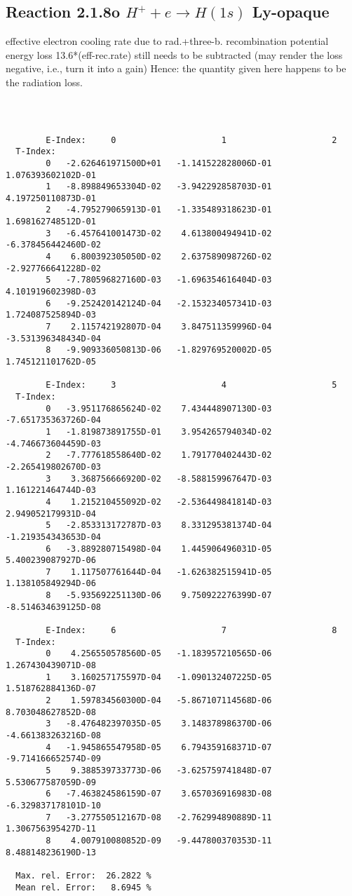 \documentclass[12pt,dvipdfmx]{article}
\begin{document}
\subsection{
  Reaction 2.1.8o $H^+ + e \rightarrow H(1s) $ Ly-opaque
}

   effective electron cooling rate due to rad.+three-b. recombination
   potential energy loss 13.6*(eff-rec.rate) still needs to be
   subtracted (may render the loss negative, i.e., turn it into a gain)
   Hence: the quantity given here happens to be the radiation loss.

\begin{small}\begin{verbatim}



        E-Index:     0                     1                     2
  T-Index:
        0   -2.626461971500D+01   -1.141522828006D-01    1.076393602102D-01
        1   -8.898849653304D-02   -3.942292858703D-01    4.197250110873D-01
        2   -4.795279065913D-01   -1.335489318623D-01    1.698162748512D-01
        3   -6.457641001473D-02    4.613800494941D-02   -6.378456442460D-02
        4    6.800392305050D-02    2.637589098726D-02   -2.927766641228D-02
        5   -7.780596827160D-03   -1.696354616404D-03    4.101919602398D-03
        6   -9.252420142124D-04   -2.153234057341D-03    1.724087525894D-03
        7    2.115742192807D-04    3.847511359996D-04   -3.531396348434D-04
        8   -9.909336050813D-06   -1.829769520002D-05    1.745121101762D-05

        E-Index:     3                     4                     5
  T-Index:
        0   -3.951176865624D-02    7.434448907130D-03   -7.651735363726D-04
        1   -1.819873891755D-01    3.954265794034D-02   -4.746673604459D-03
        2   -7.777618558640D-02    1.791770402443D-02   -2.265419802670D-03
        3    3.368756666920D-02   -8.588159967647D-03    1.161221464744D-03
        4    1.215210455092D-02   -2.536449841814D-03    2.949052179931D-04
        5   -2.853313172787D-03    8.331295381374D-04   -1.219354343653D-04
        6   -3.889280715498D-04    1.445906496031D-05    5.400239087927D-06
        7    1.117507761644D-04   -1.626382515941D-05    1.138105849294D-06
        8   -5.935692251130D-06    9.750922276399D-07   -8.514634639125D-08

        E-Index:     6                     7                     8
  T-Index:
        0    4.256550578560D-05   -1.183957210565D-06    1.267430439071D-08
        1    3.160257175597D-04   -1.090132407225D-05    1.518762884136D-07
        2    1.597834560300D-04   -5.867107114568D-06    8.703048627852D-08
        3   -8.476482397035D-05    3.148378986370D-06   -4.661383263216D-08
        4   -1.945865547958D-05    6.794359168371D-07   -9.714166652574D-09
        5    9.388539733773D-06   -3.625759741848D-07    5.530677587059D-09
        6   -7.463824586159D-07    3.657036916983D-08   -6.329837178101D-10
        7   -3.277550512167D-08   -2.762994890889D-11    1.306756395427D-11
        8    4.007910080852D-09   -9.447800370353D-11    8.488148236190D-13

  Max. rel. Error:  26.2822 %
  Mean rel. Error:   8.6945 %

\end{verbatim}\end{small}
\end{document}
